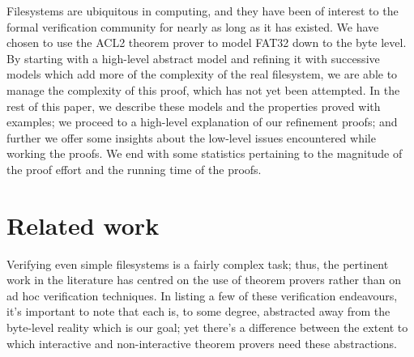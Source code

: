\documentclass[runningheads,a4paper]{llncs}
\begin{document}
Filesystems are ubiquitous in computing, and they have been of
interest to the formal verification community for nearly as long as it
has existed. We have chosen to use the ACL2 theorem prover
to model FAT32 down to the byte level. By starting with a high-level
abstract model and refining \cite{abadi1991existence} it with
successive models which add more of the complexity of the real
filesystem, we are able to manage the complexity of this proof, which
has not yet been attempted. In the rest of this paper, we describe these
models and the properties proved with examples; we proceed to a
high-level explanation of our refinement proofs; and further we offer
some insights about the low-level issues encountered while working the
proofs. We end with some statistics pertaining to the magnitude of the
proof effort and the running time of the proofs.

\section{Related work}

Verifying even simple filesystems is a fairly complex task; thus, the
pertinent work in the literature has centred on the use of theorem
provers rather than on ad hoc verification techniques. In listing a
few of these verification endeavours, it's important to note that each
is, to some degree, abstracted away from the byte-level reality which
is our goal; yet there's a difference between the extent to which
interactive and non-interactive theorem provers need these
abstractions.
\end{document}
